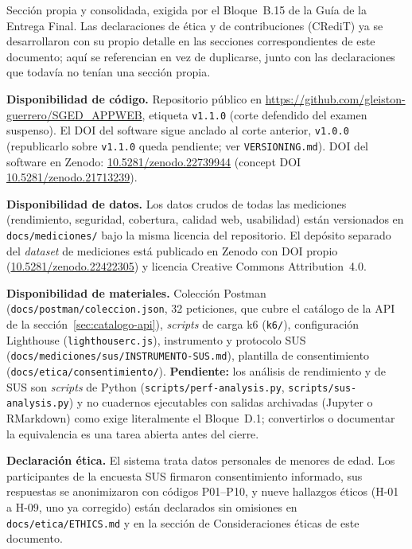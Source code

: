 \documentclass[11pt,a4paper]{article}
\newcommand{\ruta}[1]{\texttt{\footnotesize #1}}
\begin{document}
Sección propia y consolidada, exigida por el Bloque~B.15 de la Guía de
la Entrega Final. Las declaraciones de ética y de contribuciones
(CRediT) ya se desarrollaron con su propio detalle en las secciones
correspondientes de este documento; aquí se referencian en vez de
duplicarse, junto con las declaraciones que todavía no tenían una
sección propia.

\textbf{Disponibilidad de código.} Repositorio público en
\url{https://github.com/gleiston-guerrero/SGED_APPWEB}, etiqueta \texttt{v1.1.0}
(corte defendido del examen suspenso). El DOI del software sigue
anclado al corte anterior, \texttt{v1.0.0} (republicarlo sobre
\texttt{v1.1.0} queda pendiente; ver \texttt{VERSIONING.md}). DOI del software en
Zenodo: \href{https://doi.org/10.5281/zenodo.22739944}{10.5281/zenodo.22739944}
(concept DOI
\href{https://doi.org/10.5281/zenodo.21713239}{10.5281/zenodo.21713239}).

\textbf{Disponibilidad de datos.} Los datos crudos de todas las
mediciones (rendimiento, seguridad, cobertura, calidad web, usabilidad)
están versionados en \ruta{docs/mediciones/} bajo la misma licencia del
repositorio. El depósito separado del \emph{dataset} de mediciones está
publicado en Zenodo con DOI propio (\href{https://doi.org/10.5281/zenodo.22422305}{10.5281/zenodo.22422305})
y licencia Creative Commons Attribution~4.0.

\textbf{Disponibilidad de materiales.} Colección Postman
(\ruta{docs/postman/coleccion.json}, 32 peticiones, que cubre el catálogo
de la API de la sección~\ref{sec:catalogo-api}), \emph{scripts} de
carga k6 (\ruta{k6/}), configuración Lighthouse
(\ruta{lighthouserc.js}), instrumento y protocolo SUS
(\ruta{docs/mediciones/sus/INSTRUMENTO-SUS.md}), plantilla de
consentimiento (\ruta{docs/etica/consentimiento/}). \textbf{Pendiente:}
los análisis de rendimiento y de SUS son \emph{scripts} de Python
(\ruta{scripts/perf-analysis.py}, \ruta{scripts/sus-analysis.py}) y no
cuadernos ejecutables con salidas archivadas (Jupyter o RMarkdown) como
exige literalmente el Bloque~D.1; convertirlos o documentar la
equivalencia es una tarea abierta antes del cierre.

\textbf{Declaración ética.} El sistema trata datos personales de
menores de edad. Los participantes de la encuesta SUS firmaron
consentimiento informado, sus respuestas se anonimizaron con códigos
P01–P10, y nueve hallazgos éticos (H-01 a H-09, uno ya corregido) están
declarados sin omisiones en \ruta{docs/etica/ETHICS.md} y en la sección
de Consideraciones éticas de este documento.
\end{document}
